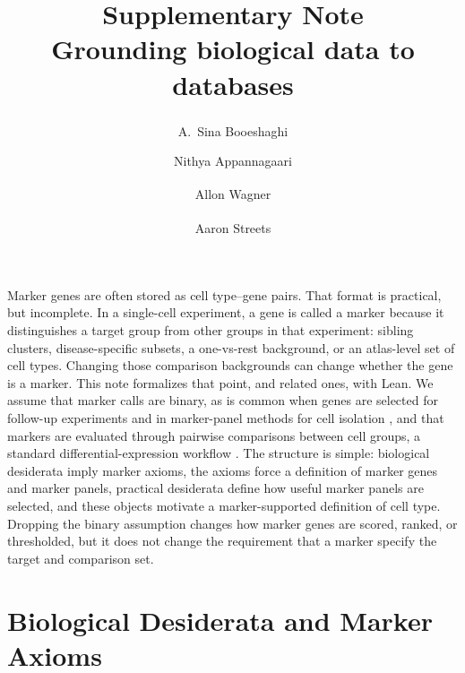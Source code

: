 \documentclass{article}
\begin{document}
\date{}
\title{\textbf{Supplementary Note}\\Grounding biological data to databases}
\author[1]{A.~Sina Booeshaghi\textsuperscript{\textdagger}}
\author[1]{Nithya Appannagaari}
\author[2,3,4]{Allon Wagner\textsuperscript{\textdagger}}
\author[1,3,4]{Aaron Streets\textsuperscript{\textdagger}}
\setlength{\affilsep}{2pt}
\maketitle
{}

Marker genes are often stored as cell type--gene pairs. That format is practical, but incomplete. In a single-cell experiment, a gene is called a marker because it distinguishes a target group from other groups in that experiment: sibling clusters, disease-specific subsets, a one-vs-rest background, or an atlas-level set of cell types. Changing those comparison backgrounds can change whether the gene is a marker. This note formalizes that point, and related ones, with Lean. We assume that marker calls are binary, as is common when genes are selected for follow-up experiments and in marker-panel methods for cell isolation \citep{Delaney2019COMET,Tangherloni2023MAGNETO}, and that markers are evaluated through pairwise comparisons between cell groups, a standard differential-expression workflow \citep{Robinson_2009}. The structure is simple: biological desiderata imply marker axioms, the axioms force a definition of marker genes and marker panels, practical desiderata define how useful marker panels are selected, and these objects motivate a marker-supported definition of cell type. Dropping the binary assumption changes how marker genes are scored, ranked, or thresholded, but it does not change the requirement that a marker specify the target and comparison set.

\section{Biological Desiderata and Marker Axioms}
\end{document}
